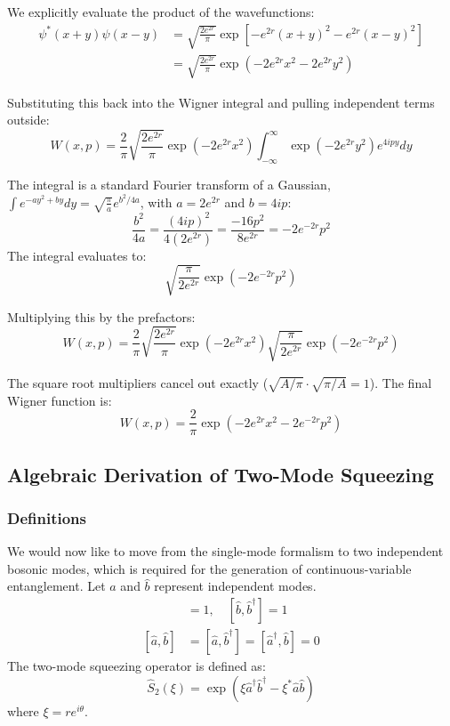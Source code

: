 {We explicitly evaluate the product of the wavefunctions:
\begin{align*}
\psi^*(x+y)\psi(x-y) &= \sqrt{\frac{2e^{2r}}{\pi}} \exp\left[ -e^{2r}(x+y)^2 - e^{2r}(x-y)^2 \right] \\
&= \sqrt{\frac{2e^{2r}}{\pi}} \exp\left( -2e^{2r}x^2 - 2e^{2r}y^2 \right)
\end{align*}

Substituting this back into the Wigner integral and pulling independent terms outside:
\begin{equation*}
W(x,p) = \frac{2}{\pi} \sqrt{\frac{2e^{2r}}{\pi}} \exp\left(-2e^{2r}x^2\right) \int_{-\infty}^{\infty} \exp\left(-2e^{2r}y^2\right) e^{4ipy} dy
\end{equation*}

The integral is a standard Fourier transform of a Gaussian, $\int e^{-ay^2 + by} dy = \sqrt{\frac{\pi}{a}} e^{b^2 / 4a}$, with $a = 2e^{2r}$ and $b = 4ip$:
\begin{equation*}
\frac{b^2}{4a} = \frac{(4ip)^2}{4(2e^{2r})} = \frac{-16p^2}{8e^{2r}} = -2e^{-2r}p^2
\end{equation*}
The integral evaluates to:
\begin{equation*}
\sqrt{\frac{\pi}{2e^{2r}}} \exp\left(-2e^{-2r}p^2\right)
\end{equation*}

Multiplying this by the prefactors:
\begin{equation*}
W(x,p) = \frac{2}{\pi} \sqrt{\frac{2e^{2r}}{\pi}} \exp\left(-2e^{2r}x^2\right) \sqrt{\frac{\pi}{2e^{2r}}} \exp\left(-2e^{-2r}p^2\right)
\end{equation*}

The square root multipliers cancel out exactly ($\sqrt{A/\pi} \cdot \sqrt{\pi/A} = 1$). The final Wigner function is:
\begin{equation}
W(x,p) = \frac{2}{\pi} \exp\left(-2e^{2r}x^2 - 2e^{-2r}p^2\right)
\end{equation}


\subsection{Algebraic Derivation of Two-Mode Squeezing}

\subsubsection{Definitions}
We would now like to move from the single-mode formalism to two independent bosonic modes, which is required for the generation of continuous-variable entanglement.
Let $\hat{a}$ and $\hat{b}$ represent independent modes.
\begin{align*}
[\hat{a}, \hat{a}^\dagger] &= 1, \quad [\hat{b}, \hat{b}^\dagger] = 1 \\
[\hat{a}, \hat{b}] &= [\hat{a}, \hat{b}^\dagger] = [\hat{a}^\dagger, \hat{b}] = 0
\end{align*}
The two-mode squeezing operator is defined as:
\begin{equation*}
\hat{S}_2(\xi) = \exp(\xi\hat{a}^\dagger\hat{b}^\dagger - \xi^*\hat{a}\hat{b})
\end{equation*}
where $\xi = re^{i\theta}$.

}

